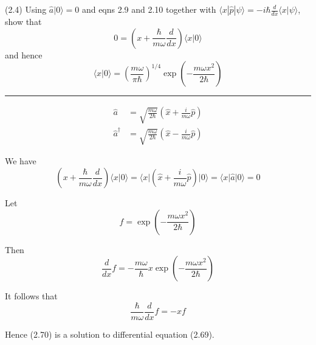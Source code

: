 \documentclass[12pt]{article}
\begin{document}
(2.4)
Using $\hat a|0\rangle=0$ and eqns 2.9 and 2.10 together with
$\langle x|\hat p|\psi\rangle=-i\hbar\frac{d}{dx}\langle x|\psi\rangle$, show that
\begin{equation*}
0=\left(x+\frac{\hbar}{m\omega}\frac{d}{dx}\right)
\langle x|0\rangle
\tag{2.69}
\end{equation*}
and hence
\begin{equation*}
\langle x|0\rangle=\left(\frac{m\omega}{\pi\hbar}\right)^{1/4}
\exp\left(-\frac{m\omega x^2}{2\hbar}\right)
\tag{2.70}
\end{equation*}

\bigskip
\hrule

\bigskip
\begin{align*}
\hat a&=\sqrt{\frac{m\omega}{2\hbar}}
\left(\hat x+\frac{i}{m\omega}\hat p\right)
\tag{2.9}
\\
\hat a^\dag&=\sqrt{\frac{m\omega}{2\hbar}}
\left(\hat x-\frac{i}{m\omega}\hat p\right)
\tag{2.10}
\end{align*}

We have
\begin{equation*}
\left(x+\frac{\hbar}{m\omega}\frac{d}{dx}\right)\langle x|0\rangle
=\langle x|\left(\hat x+\frac{i}{m\omega}\hat p\right)|0\rangle
=\langle x|\hat a|0\rangle
=0
\end{equation*}

Let
\begin{equation*}
f=\exp\left(-\frac{m\omega x^2}{2\hbar}\right)
\end{equation*}

Then
\begin{equation*}
\frac{d}{dx}f=-\frac{m\omega}{\hbar}x\exp\left(-\frac{m\omega x^2}{2\hbar}\right)
\end{equation*}

It follows that
\begin{equation*}
\frac{\hbar}{m\omega}\frac{d}{dx}f=-xf
\end{equation*}

Hence (2.70) is a solution to differential equation (2.69).
\end{document}
